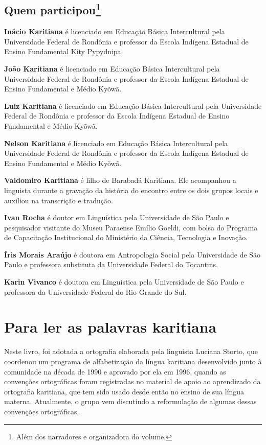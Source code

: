 \section{Quem participou\footnote{Além dos narradores e organizadora do volume.}}

\textbf{Inácio Karitiana} é licenciado em Educação Básica Intercultural pela
 Universidade Federal de Rondônia e professor da Escola Indígena Estadual
 de Ensino Fundamental Kity Pypydnipa.


\textbf{João Karitiana} é licenciado em Educação Básica Intercultural pela
 Universidade Federal de Rondônia e professor da Escola Indígena Estadual
 de Ensino Fundamental e Médio Kyõwã.


\textbf{Luiz Karitiana} é licenciado em Educação Básica Intercultural pela
 Universidade Federal de Rondônia e professor da Escola Indígena Estadual
 de Ensino Fundamental e Médio Kyõwã.


\textbf{Nelson Karitiana} é licenciado em Educação Básica Intercultural pela Universidade Federal de Rondônia e professor da Escola Indígena Estadual de Ensino Fundamental e Médio Kyõwã.

\textbf{Valdomiro Karitiana} é filho de Barabadá Karitiana. Ele acompanhou a linguista durante a gravação da história do encontro entre os dois grupos locais e auxiliou na transcrição e tradução. 


\textbf{Ivan Rocha} é doutor em Linguística pela Universidade de São Paulo e
 pesquisador visitante do Museu Paraense Emílio Goeldi, com bolsa do
 Programa de Capacitação Institucional do Ministério da Ciência,
 Tecnologia e Inovação.


\textbf{Íris Morais Araújo} é doutora em Antropologia Social pela Universidade de São Paulo e professora substituta da Universidade Federal do Tocantins.


\textbf{Karin Vivanco} é doutora em Linguística pela Universidade de São Paulo e professora da Universidade Federal do Rio Grande do Sul.

\chapter{Para ler as palavras karitiana}

Neste livro, foi adotada a ortografia elaborada pela linguista Luciana
Storto, que coordenou um programa de alfabetização da língua karitiana
desenvolvido junto à comunidade na década de 1990 e aprovado por ela em
1996, quando as convenções ortográficas foram registradas no material de
apoio ao aprendizado da ortografia karitiana, que tem sido usado desde
então no ensino de sua língua materna. Atualmente, o grupo vem
discutindo a reformulação de algumas dessas convenções ortográficas.


